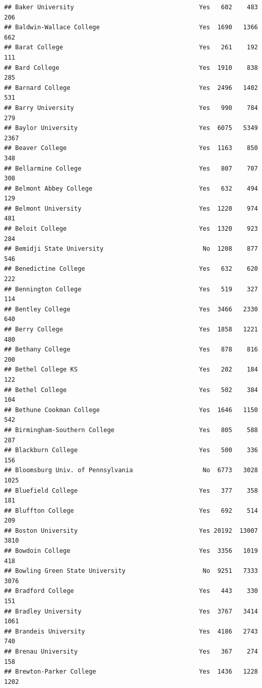 \documentclass[
]{article}
\begin{document}
\begin{verbatim}
## Baker University                                  Yes   602    483    206
## Baldwin-Wallace College                           Yes  1690   1366    662
## Barat College                                     Yes   261    192    111
## Bard College                                      Yes  1910    838    285
## Barnard College                                   Yes  2496   1402    531
## Barry University                                  Yes   990    784    279
## Baylor University                                 Yes  6075   5349   2367
## Beaver College                                    Yes  1163    850    348
## Bellarmine College                                Yes   807    707    308
## Belmont Abbey College                             Yes   632    494    129
## Belmont University                                Yes  1220    974    481
## Beloit College                                    Yes  1320    923    284
## Bemidji State University                           No  1208    877    546
## Benedictine College                               Yes   632    620    222
## Bennington College                                Yes   519    327    114
## Bentley College                                   Yes  3466   2330    640
## Berry College                                     Yes  1858   1221    480
## Bethany College                                   Yes   878    816    200
## Bethel College KS                                 Yes   202    184    122
## Bethel College                                    Yes   502    384    104
## Bethune Cookman College                           Yes  1646   1150    542
## Birmingham-Southern College                       Yes   805    588    287
## Blackburn College                                 Yes   500    336    156
## Bloomsburg Univ. of Pennsylvania                   No  6773   3028   1025
## Bluefield College                                 Yes   377    358    181
## Bluffton College                                  Yes   692    514    209
## Boston University                                 Yes 20192  13007   3810
## Bowdoin College                                   Yes  3356   1019    418
## Bowling Green State University                     No  9251   7333   3076
## Bradford College                                  Yes   443    330    151
## Bradley University                                Yes  3767   3414   1061
## Brandeis University                               Yes  4186   2743    740
## Brenau University                                 Yes   367    274    158
## Brewton-Parker College                            Yes  1436   1228   1202

\end{verbatim}
\end{document}
